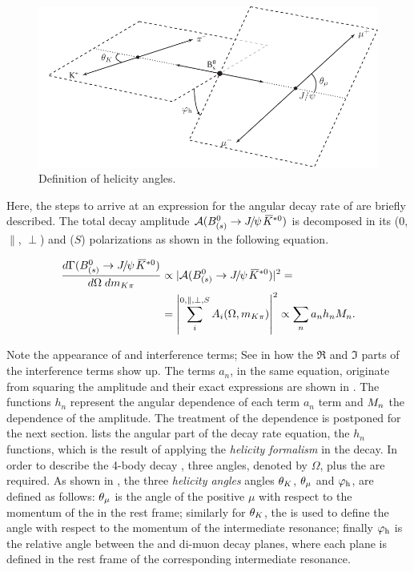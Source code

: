 \begin{figure}[t]
  \centering
  \includegraphics[width=\textwidth]{Figures/Chapter4/helAngles}
  \caption{Definition of helicity angles.}
  \label{helAngles}
\end{figure}

Here, the steps to arrive at an expression for the angular decay rate of \BsJpsiKst are briefly described.
The total decay amplitude $\mathcal{A}(\text{\BJpsiKst})$ is decomposed in its \pwave ($0$, $\parallel$, $\perp$)
and \swave ($S$) polarizations as shown in the following equation.

\begin{align}
  \centering
  \frac{d\Gamma(\text{\BJpsiKst})}{d\Omega\;d\mkpi} &\propto |\mathcal{A}(\text{\BJpsiKst})|^2 = \nonumber \\
                                                    &= \left| \sum_i^{0,\parallel,\perp,S} A_i(\Omega,\mkpi) \right|^2  \propto \sum_n a_n h_n \mKpiAmp.
  \label{ang_terms}
\end{align}

\noindent Note the appearance of \pwave and \spwave interference terms; See in\cite{jeroenThesis} how the $\Re$
and $\Im$ parts of the interference terms show up. The terms $a_n$, in the same equation,
originate from squaring the amplitude and their exact expressions are shown in .
The functions $h_n$ represent the angular dependence of each term $a_n$ term and $M_{n}$ the \mkpi dependence of
the amplitude. The treatment of the \mkpi dependence is postponed for the next section.  lists the angular
part of the decay rate equation, \ie the $h_n$ functions, which is the result of
applying the \emph{helicity formalism} in the \BJpsiKst decay. In order to describe the 4-body decay \BJpsiKst, three
angles, denoted by $\Omega$, plus the \mkpi are required. As shown in , the three \emph{helicity angles} angles
$\theta_{K}$, $\theta_{\mu}$ and ${\varphi_{\text h}}$, are defined as follows: $\theta_{\mu}$ is the angle of the positive $\mu$ with respect to the
momentum of the \jpsi in the \Bs rest frame; similarly for $\theta_{K}$, the \kaon is used to define the angle with respect to
the momentum of the intermediate \Kpi resonance; finally ${\varphi_{\text h}}$ is the relative angle between the \Kpi and di-muon decay
planes, where each plane is defined in the rest frame of the corresponding intermediate resonance.


